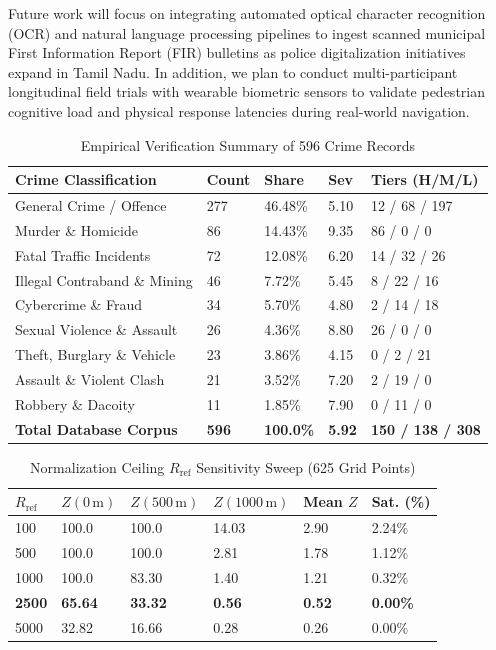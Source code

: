 \documentclass[conference]{IEEEtran}
\begin{document}
Future work will focus on integrating automated optical character recognition (OCR) and natural language processing pipelines to ingest scanned municipal First Information Report (FIR) bulletins as police digitalization initiatives expand in Tamil Nadu. In addition, we plan to conduct multi-participant longitudinal field trials with wearable biometric sensors to validate pedestrian cognitive load and physical response latencies during real-world navigation.

\begin{table}[b]
\centering
\caption{Empirical Verification Summary of 596 Crime Records}
\label{tab:corpus_breakdown}
\begin{tabular}{lllll}
\toprule
\textbf{Crime Classification} & \textbf{Count} & \textbf{Share} & \textbf{Sev} & \textbf{Tiers (H/M/L)} \\
\midrule
General Crime / Offence & 277 & 46.48\% & 5.10 & 12 / 68 / 197 \\
Murder \& Homicide & 86 & 14.43\% & 9.35 & 86 / 0 / 0 \\
Fatal Traffic Incidents & 72 & 12.08\% & 6.20 & 14 / 32 / 26 \\
Illegal Contraband \& Mining & 46 & 7.72\% & 5.45 & 8 / 22 / 16 \\
Cybercrime \& Fraud & 34 & 5.70\% & 4.80 & 2 / 14 / 18 \\
Sexual Violence \& Assault & 26 & 4.36\% & 8.80 & 26 / 0 / 0 \\
Theft, Burglary \& Vehicle & 23 & 3.86\% & 4.15 & 0 / 2 / 21 \\
Assault \& Violent Clash & 21 & 3.52\% & 7.20 & 2 / 19 / 0 \\
Robbery \& Dacoity & 11 & 1.85\% & 7.90 & 0 / 11 / 0 \\
\midrule
\textbf{Total Database Corpus} & \textbf{596} & \textbf{100.0\%} & \textbf{5.92} & \textbf{150 / 138 / 308} \\
\bottomrule
\end{tabular}
\end{table}

\begin{table}[t]
\centering
\caption{Normalization Ceiling $R_{\text{ref}}$ Sensitivity Sweep (625 Grid Points)}
\label{tab:sensitivity}
\begin{tabular}{llllll}
\toprule
\textbf{$R_{\text{ref}}$} & \textbf{$Z(0\,\text{m})$} & \textbf{$Z(500\,\text{m})$} & \textbf{$Z(1000\,\text{m})$} & \textbf{Mean $Z$} & \textbf{Sat. (\%)} \\
\midrule
100 & 100.0 & 100.0 & 14.03 & 2.90 & 2.24\% \\
500 & 100.0 & 100.0 & 2.81 & 1.78 & 1.12\% \\
1000 & 100.0 & 83.30 & 1.40 & 1.21 & 0.32\% \\
\textbf{2500} & \textbf{65.64} & \textbf{33.32} & \textbf{0.56} & \textbf{0.52} & \textbf{0.00\%} \\
5000 & 32.82 & 16.66 & 0.28 & 0.26 & 0.00\% \\
\bottomrule
\end{tabular}
\end{table}
\end{document}
